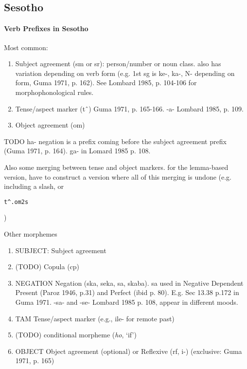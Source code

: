 




\subsection{Sesotho}

\cite{doke1967textbook}

\paragraph{Verb Prefixes in Sesotho}

Most common:
\begin{enumerate}
    \item Subject agreement (sm or sr): person/number or noun class. also has variation depending on verb form (e.g. 1st sg is ke-, ka-, N- depending on form, Guma 1971, p. 162). See Lombard 1985, p. 104-106 for morphophonological rules.
    \item Tense/aspect marker (t{\^\ }) Guma 1971, p. 165-166. -a- Lombard 1985, p. 109.
    \item Object agreement (om)
\end{enumerate}


TODO ha- negation is a prefix coming before the subject agreement prefix (Guma 1971, p. 164).  ga- in Lomard 1985 p. 108.

Also some merging between tense and object markers. for the lemma-based version, have to construct a version where all of this merging is undone (e.g. including a slash, or \begin{verbatim}t^.om2s\end{verbatim})

Other morphemes
\begin{enumerate}
    \item SUBJECT: Subject agreement
    \item (TODO) Copula (cp)
    \item NEGATION Negation (ska, seka, sa, skaba). sa used in Negative Dependent Present (Paroz 1946, p.31) and Perfect (ibid p. 80). E.g. Sec 13.38 p.172 in Guma 1971. -sa- and -se- Lombard 1985 p. 108, appear in different moods.
    \item TAM Tense/aspect marker (e.g., ile- for remote past)
    \item (TODO) conditional morpheme (\emph{ho}, `if')
    \item OBJECT Object agreement (optional) or Reflexive (rf, i-) (exclusive: Guma 1971, p. 165)
\end{enumerate}


